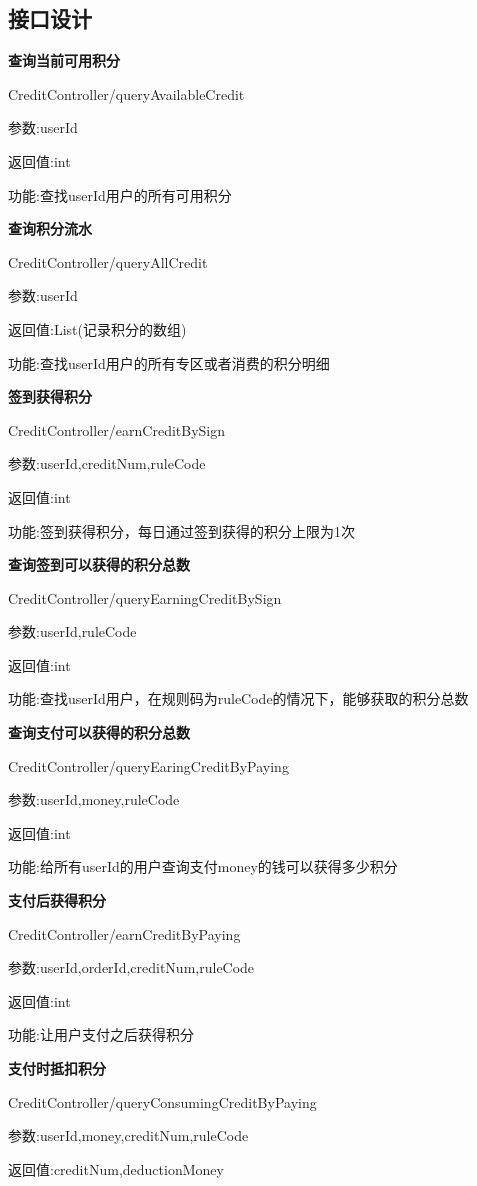 \subsection{接口设计}

\textbf{查询当前可用积分}

CreditController/queryAvailableCredit

参数:userId

返回值:int

功能:查找userId用户的所有可用积分

\textbf{查询积分流水}

CreditController/queryAllCredit

参数:userId

返回值:List(记录积分的数组)

功能:查找userId用户的所有专区或者消费的积分明细

\textbf{签到获得积分}

CreditController/earnCreditBySign

参数:userId,creditNum,ruleCode

返回值:int

功能:签到获得积分，每日通过签到获得的积分上限为1次

\textbf{查询签到可以获得的积分总数}

CreditController/queryEarningCreditBySign

参数:userId,ruleCode

返回值:int

功能:查找userId用户，在规则码为ruleCode的情况下，能够获取的积分总数

\textbf{查询支付可以获得的积分总数}

CreditController/queryEaringCreditByPaying

参数:userId,money,ruleCode

返回值:int

功能:给所有userId的用户查询支付money的钱可以获得多少积分

\textbf{支付后获得积分}

CreditController/earnCreditByPaying

参数:userId,orderId,creditNum,ruleCode

返回值:int

功能:让用户支付之后获得积分

\textbf{支付时抵扣积分}

CreditController/queryConsumingCreditByPaying

参数:userId,money,creditNum,ruleCode

返回值:creditNum,deductionMoney

